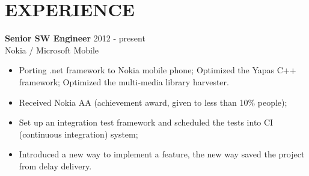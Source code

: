 
\section{EXPERIENCE}
\textbf{Senior SW Engineer} \hfill 2012 - present\\
        Nokia / Microsoft Mobile
        \begin{itemize}  \itemsep -2pt %
        \item Porting .net framework to Nokia mobile phone;
        Optimized the Yapas C++ framework;
        Optimized the multi-media library harvester.
        \item Received Nokia AA (achievement award, given to less than 10\% people);
        \item Set up an integration test framework
        and scheduled the tests into CI (continuous integration) system;
        \item Introduced a new way to implement a feature,
        the new way saved the project from delay delivery.
        \end{itemize}

